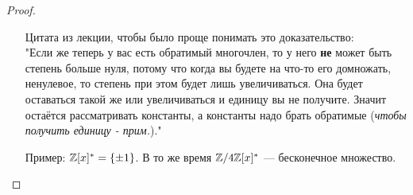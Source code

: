 \begin{normalsize}
\begin{proof}
\begin{itemize}
        Цитата из лекции, чтобы было проще понимать это доказательство: \\
        "Если же теперь у вас есть обратимый многочлен, то у него \textbf{не} может быть степень больше нуля,
        потому что когда вы будете на что-то его домножать, ненулевое, то степень при этом будет лишь
        увеличиваться. Она будет оставаться такой же или увеличиваться и единицу вы не получите.
        Значит остаётся рассматривать константы, а константы надо брать обратимые
        (\emph{чтобы получить единицу - прим.})." 
        \item[Пример:] $\mathbb{Z}[x]^* = \{ \pm 1 \}$. В то же время $\mathbb{Z} / 4\mathbb{Z} [x]^*$ --- бесконечное множество.
    \end{itemize} 
\end{proof}

\end{normalsize}